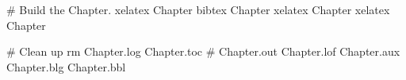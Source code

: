 # Build the Chapter.
xelatex Chapter
bibtex Chapter
xelatex Chapter
xelatex Chapter

# Clean up
rm Chapter.log  Chapter.toc # Chapter.out Chapter.lof Chapter.aux Chapter.blg Chapter.bbl

